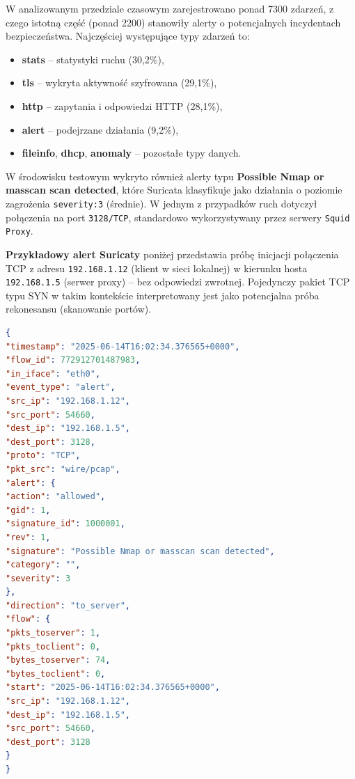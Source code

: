 \documentclass[
    left=2.5cm,         %
    right=2.5cm,        %
    top=2.5cm,          %
    bottom=3cm,         %
    bindingoffset=6mm,  %
    nohyphenation=true %
]{eiti/eiti-thesis} %
\begin{document}
W analizowanym przedziale czasowym zarejestrowano ponad 7300 zdarzeń, z czego istotną część (ponad 2200) stanowiły alerty o potencjalnych incydentach bezpieczeństwa. Najczęściej występujące typy zdarzeń to:
\begin{itemize}
    \item \textbf{stats} – statystyki ruchu (30,2\%),
    \item \textbf{tls} – wykryta aktywność szyfrowana (29,1\%),
    \item \textbf{http} – zapytania i odpowiedzi HTTP (28,1\%),
    \item \textbf{alert} – podejrzane działania (9,2\%),
    \item \textbf{fileinfo}, \textbf{dhcp}, \textbf{anomaly} – pozostałe typy danych.
\end{itemize}

W środowisku testowym wykryto również alerty typu \textbf{Possible Nmap or masscan scan detected}, które Suricata klasyfikuje jako działania o poziomie zagrożenia \texttt{severity:3} (średnie). W jednym z przypadków ruch dotyczył połączenia na port \texttt{3128/TCP}, standardowo wykorzystywany przez serwery \texttt{Squid Proxy}.

\textbf{Przykładowy alert Suricaty} poniżej przedstawia próbę inicjacji połączenia TCP z adresu \texttt{192.168.1.12} (klient w sieci lokalnej) w kierunku hosta \texttt{192.168.1.5} (serwer proxy) – bez odpowiedzi zwrotnej. Pojedynczy pakiet TCP typu SYN w takim kontekście interpretowany jest jako potencjalna próba rekonesansu (skanowanie portów).

\begin{lstlisting}[language=json, caption={Alert Suricaty typu \texttt{Possible Nmap or masscan scan detected} na porcie \texttt{3128/TCP}}, label={lst:suricata-proxy-alert}]
{
"timestamp": "2025-06-14T16:02:34.376565+0000",
"flow_id": 772912701487983,
"in_iface": "eth0",
"event_type": "alert",
"src_ip": "192.168.1.12",
"src_port": 54660,
"dest_ip": "192.168.1.5",
"dest_port": 3128,
"proto": "TCP",
"pkt_src": "wire/pcap",
"alert": {
"action": "allowed",
"gid": 1,
"signature_id": 1000001,
"rev": 1,
"signature": "Possible Nmap or masscan scan detected",
"category": "",
"severity": 3
},
"direction": "to_server",
"flow": {
"pkts_toserver": 1,
"pkts_toclient": 0,
"bytes_toserver": 74,
"bytes_toclient": 0,
"start": "2025-06-14T16:02:34.376565+0000",
"src_ip": "192.168.1.12",
"dest_ip": "192.168.1.5",
"src_port": 54660,
"dest_port": 3128
}
}
\end{lstlisting}
\end{document}
